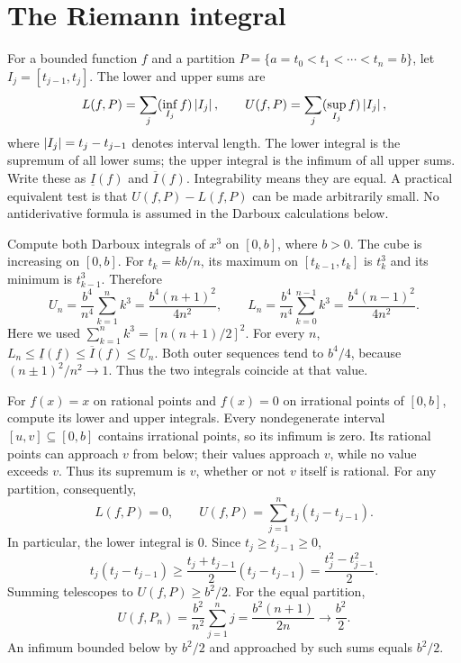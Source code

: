 \section{The Riemann integral}
For a bounded function $f$ and a partition
$P=\{a=t_0<t_1<\cdots<t_n=b\}$, let $I_j=[t_{j-1},t_j]$.
The lower and upper sums are
\[
 L(f,P)=\sum_j(\inf_{I_j}f)\left|I_j\right|,\qquad
 U(f,P)=\sum_j(\sup_{I_j}f)\left|I_j\right|,
\]
where $\left|I_j\right|=t_j-t_{j-1}$ denotes interval length. The lower integral
is the supremum of all lower sums; the upper integral is the infimum of
all upper sums. Write these as $\underline I(f)$ and $\overline I(f)$.
Integrability means they are equal. A practical equivalent test is that
$U(f,P)-L(f,P)$ can be made arbitrarily small. No antiderivative formula
is assumed in the Darboux calculations below.

\goal Compute both Darboux integrals of $x^3$ on $[0,b]$, where $b>0$.
The cube is increasing on $[0,b]$. For $t_k=kb/n$, its maximum on
$[t_{k-1},t_k]$ is $t_k^3$ and its minimum is $t_{k-1}^3$. Therefore
\[
 U_n=\frac{b^4}{n^4}\sum_{k=1}^n k^3
     =\frac{b^4(n+1)^2}{4n^2},\qquad
 L_n=\frac{b^4}{n^4}\sum_{k=0}^{n-1} k^3
     =\frac{b^4(n-1)^2}{4n^2}.
\]
Here we used $\sum_{k=1}^n k^3=[n(n+1)/2]^2$.
For every $n$,
$L_n\le\underline I(f)\le\overline I(f)\le U_n$.
Both outer sequences tend to $b^4/4$, because $(n\pm1)^2/n^2\to1$.
Thus the two integrals coincide at that value.

\goal For $f(x)=x$ on rational points and $f(x)=0$ on irrational points
of $[0,b]$, compute its lower and upper integrals.
Every nondegenerate interval $[u,v]\subseteq[0,b]$ contains irrational
points, so its infimum is zero. Its rational points can approach $v$
from below; their values approach $v$, while no value exceeds $v$.
Thus its supremum is $v$, whether or not $v$ itself is rational.
For any partition, consequently,
\[
 L(f,P)=0,\qquad U(f,P)=\sum_{j=1}^n t_j(t_j-t_{j-1}).
\]
In particular, the lower integral is $0$.
Since $t_j\ge t_{j-1}\ge0$,
\[
 t_j(t_j-t_{j-1})\ge
 \frac{t_j+t_{j-1}}2(t_j-t_{j-1})
 =\frac{t_j^2-t_{j-1}^2}{2}.
\]
Summing telescopes to $U(f,P)\ge b^2/2$. For the equal partition,
\[
 U(f,P_n)=\frac{b^2}{n^2}\sum_{j=1}^n j
 =\frac{b^2(n+1)}{2n}\longrightarrow\frac{b^2}{2}.
\]
An infimum bounded below by $b^2/2$ and approached by such sums equals
$b^2/2$.

